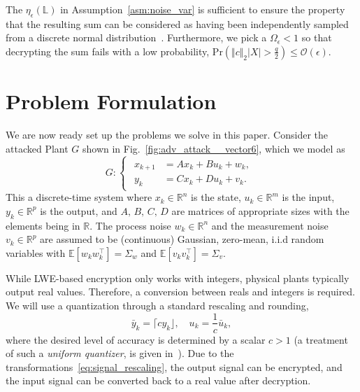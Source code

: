 \documentclass[journal, twoside, web]{ieeecolorpreprint}
\begin{document}
The $\eta_\epsilon(\mathbb L)$ in Assumption~\ref{asm:noise_var} is sufficient to ensure the property that the resulting sum can be considered as having been independently sampled from a discrete normal distribution~\cite{boneh2011}. Furthermore, we pick a $\Omega_\epsilon<1$ so that decrypting the sum fails with a low probability, $\mathrm{Pr}(\Vert c \Vert_2|X|> \frac{q}{2}) \leq \mathcal{O}(\epsilon)$.


\section{Problem Formulation} \label{sec:problem}
We are now ready set up the problems we solve in this paper. Consider the attacked Plant $G$ shown in Fig.~\ref{fig:adv_attack__vector6}, which we model as
\begin{equation} \label{eq:system}
    G: \begin{cases}
    \begin{aligned}
    x_{k+1} & =  Ax_k + B u_k + w_k, \\
      y_k & =   Cx_k + Du_k +v_k.
    \end{aligned}
    \end{cases}
\end{equation}
This a discrete-time system where $x_k \in\mathbb{R}^n$ is the state, $u_k\in\mathbb{R}^m$ is the input, $y_k\in\mathbb{R}^p$ is the output, and ${A, \, B, \, C, \, D}$ are matrices of appropriate sizes with the elements being in $\mathbb{R}$. The process noise $w_k\in \mathbb{R}^n$ and the measurement noise $v_k\in \mathbb{R}^p$ are assumed to be (continuous) Gaussian, zero-mean, i.i.d random variables with $\mathbb{E} [ w_k w_k^\top]=\Sigma_w$ and $\mathbb{E} [ v_k v_k^\top]=\Sigma_v$. 

While LWE-based encryption only works with integers, physical plants typically output real values. Therefore, a conversion between reals and integers is required. We will use a quantization through a standard rescaling and rounding,
\begin{equation}\label{eq:signal_rescaling}
    \bar y_k = \lceil c y_k \rfloor, \quad u_k = \frac{1}{c} \bar u_k,
\end{equation}
where the desired level of accuracy is determined by a scalar $c >1$ (a treatment of such a \emph{uniform quantizer}, is given in~\cite{delchamps1990}). Due to the transformations~\eqref{eq:signal_rescaling}, the output signal can be encrypted, and the input signal can be converted back to a real value after decryption.
\end{document}
